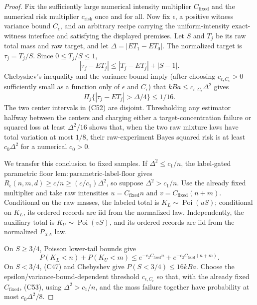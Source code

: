 \documentclass{article}
\begin{document}
\begin{proof}
Fix the sufficiently large numerical intensity multiplier \(C_{\mathrm{fixed}}\) and the numerical risk multiplier \(c_{\mathrm{risk}}\) once and for all.  Now fix \(\epsilon\), a positive witness variance bound \(C_\epsilon\), and an arbitrary recipe carrying the uniform-intensity exact-witness interface and satisfying the displayed premises.  Let \(S\) and \(T_j\) be its raw total mass and raw target, and let \(\Delta=|ET_1-ET_0|\).  The normalized target is \(\tau_j=T_j/S\).  Since \(0\le T_j/S\le1\),
\[
 |\tau_j-ET_j|\le|T_j-ET_j|+|S-1|.                                \tag{C51}
\]
Chebyshev's inequality and the variance bound imply (after choosing \(c_{\epsilon,C_\epsilon}>0\) sufficiently small as a function only of \(\epsilon\) and \(C_\epsilon\)) that \(kBa\le c_{\epsilon,C_\epsilon}\Delta^2\) gives
\[
 \Pi_j\{|\tau_j-ET_j|>\Delta/4\}\le1/16.                          \tag{C52}
\]
The two center intervals in (C52) are disjoint.  Thresholding any estimator halfway between the centers and charging either a target-concentration failure or squared loss at least \(\Delta^2/16\) shows that, when the two raw mixture laws have total variation at most \(1/8\), their raw-experiment Bayes squared risk is at least \(c_0\Delta^2\) for a numerical \(c_0>0\).

We transfer this conclusion to fixed samples.  If \(\Delta^2\le c_1/n\), the label-gated parametric floor \(\mathrm{lem:parametric\mbox{-}label\mbox{-}floor}\) gives \(R_\epsilon(n,m,d)\ge c/n\ge(c/c_1)\Delta^2\), so suppose \(\Delta^2>c_1/n\).  Use the already fixed multiplier and take raw intensities \(u=C_{\mathrm{fixed}}n\) and \(v=C_{\mathrm{fixed}}(n+m)\).  Conditional on the raw masses, the labeled total is \(K_L\sim\operatorname{Poi}(uS)\); conditional on \(K_L\), its ordered records are iid from the normalized law.  Independently, the auxiliary total is \(K_U\sim\operatorname{Poi}(vS)\), and its ordered records are iid from the normalized \(P_{XA}\) law.

On \(S\ge3/4\), Poisson lower-tail bounds give
\[
 P(K_L<n)+P(K_U<m)\le e^{-c_2C_{\mathrm{fixed}}n}+e^{-c_2C_{\mathrm{fixed}}(n+m)}.                   \tag{C53}
\]
On \(S<3/4\), (C47) and Chebyshev give \(P(S<3/4)\le16kBa\).  Choose the epsilon/variance-bound-dependent threshold \(c_{\epsilon,C_\epsilon}\) so that, with the already fixed \(C_{\mathrm{fixed}}\), (C53), using \(\Delta^2>c_1/n\), and the mass failure together have probability at most \(c_0\Delta^2/8\).


\end{proof}
\end{document}
